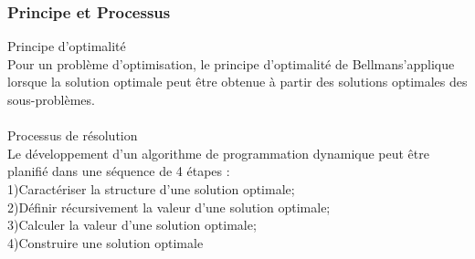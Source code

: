 \documentclass[5pt]{article}
\begin{document}
\begin{scriptsize}
\subsubsection{Principe et Processus}
Principe d’optimalité\\
Pour un problème d’optimisation, le principe d’optimalité de Bellmans’applique lorsque la solution optimale peut être obtenue à partir des solutions optimales des sous-problèmes.\\
\\
Processus de résolution\\
Le développement d’un algorithme de programmation dynamique peut être planifié dans une séquence de 4 étapes :\\
1)Caractériser la structure d’une solution optimale;\\
2)Définir récursivement la valeur d’une solution optimale;\\
3)Calculer la valeur d’une solution optimale;\\
4)Construire une solution optimale

\end{scriptsize}
\end{document}
